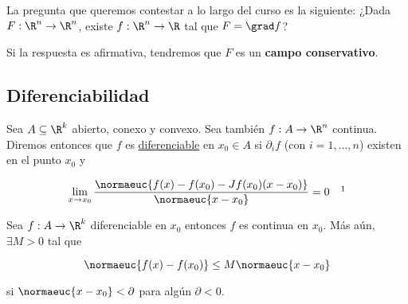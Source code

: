 \begin{pre}
    La pregunta que queremos contestar a lo largo del curso es la siguiente: ¿Dada $F: \R^n \rightarrow \R^n$, existe $f: \R^n \rightarrow \R$ tal que $F = \grad f$?
    
    Si la respuesta es afirmativa, tendremos que $F$ es un \textbf{campo conservativo}.
\end{pre}

\subsection{Diferenciabilidad}

\begin{defn}
    Sea $A \subseteq \R^k$ abierto, conexo y convexo. Sea también $f: A \rightarrow \R^n$ continua. Diremos entonces que $f$ es \ul{diferenciable} en $x_0 \in A$ si $\partial_i f$ (con $i = 1, \dots, n$) existen en el punto $x_0$ y 
    
    \[
    \lim_{x \to x_0} \frac{\normaeuc{f(x) - f(x_0) - Jf(x_0)(x - x_0)}}{\normaeuc{x - x_0}} = 0 \quad \footnotemark
    \]
\end{defn}

\begin{teo}
    Sea $f: A \rightarrow \R^k$ diferenciable en $x_0$ entonces $f$ es continua en $x_0$. Más aún, $\exists M > 0$ tal que
    
    \[
    \normaeuc{f(x) - f(x_0)} \leq M \normaeuc{x - x_0}
    \]
    
    \noindent si $\normaeuc{x - x_0} < \partial$ para algún $\partial < 0$.
\end{teo}

